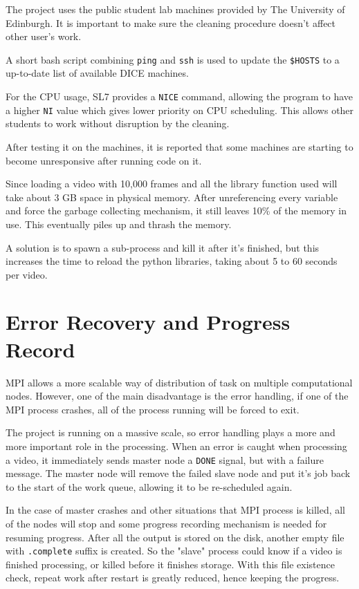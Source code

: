 \documentclass[bsc,logo,twoside,fullspacing,parskip]{infthesis}
\begin{document}
The project uses the public student lab machines provided by The University of Edinburgh. 
It is important to make sure the cleaning procedure doesn't affect other user's work.

A short bash script combining {\tt ping} and {\tt ssh} is used to update the {\tt \$HOSTS} to a up-to-date list of available DICE machines.

For the CPU usage, SL7 provides a {\tt NICE} command, allowing the program to have a higher {\tt NI} value which gives lower priority on CPU scheduling. This allows other students to work without disruption by the cleaning.

After testing it on the machines, it is reported that some machines are starting to become unresponsive after running code on it.

Since loading a video with 10,000 frames and all the library function used will take about 3 GB space in physical memory. 
After unreferencing every variable and force the garbage collecting mechanism, it still leaves 10\% of the memory in use. This eventually piles up and thrash the memory. 

A solution is to spawn a sub-process and kill it after it's finished, but this increases the time to reload the python libraries, taking about 5 to 60 seconds per video.

\section{Error Recovery and Progress Record}

MPI allows a more scalable way of distribution of task on multiple computational nodes.
However, one of the main disadvantage is the error handling, if one of the MPI process crashes, all of the process running will be forced to exit.

The project is running on a massive scale, so error handling plays a more and more important role in the processing. 
When an error is caught when processing a video, it immediately sends master node a {\tt DONE} signal, but with a failure message. The master node will remove the failed slave node and put it's job back to the start of the work queue, allowing it to be re-scheduled again.

In the case of master crashes and other situations that MPI process is killed, all of the nodes will stop and some progress recording mechanism is needed for resuming progress. After all the output is stored on the disk, another empty file with {\tt .complete} suffix is created. So the "slave" process could know if a video is finished processing, or killed before it finishes storage. With this file existence check, repeat work after restart is greatly reduced, hence keeping the progress.
\end{document}
